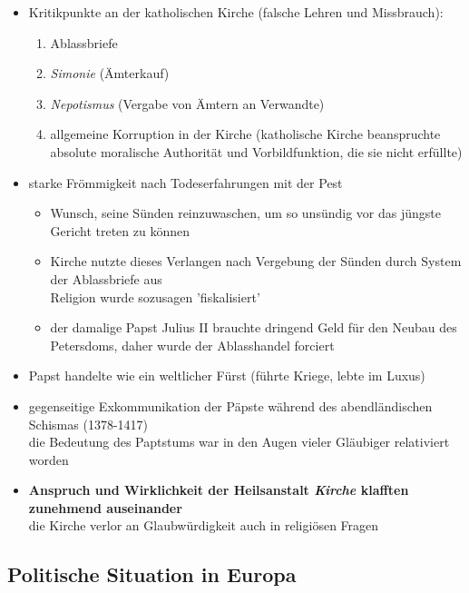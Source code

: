 \documentclass[11pt,a4paper]{article}
\begin{document}
\begin{itemize}
\item Kritikpunkte an der katholischen Kirche (falsche Lehren und Missbrauch):

	\begin{enumerate}
	\item Ablassbriefe
	\item \textsl{Simonie} (Ämterkauf)
	\item \textsl{Nepotismus} (Vergabe von Ämtern an Verwandte)
	\item allgemeine Korruption in der Kirche (katholische Kirche beanspruchte absolute moralische Authorität und Vorbildfunktion, die sie nicht erfüllte)
	\end{enumerate}

\item starke Frömmigkeit nach Todeserfahrungen mit der Pest

	\begin{itemize}
	\item Wunsch, seine Sünden reinzuwaschen, um so unsündig vor das jüngste Gericht treten zu können
	\item Kirche nutzte dieses Verlangen nach Vergebung der Sünden durch System der Ablassbriefe aus\\
	 Religion wurde sozusagen 'fiskalisiert'
	\item der damalige Papst Julius II brauchte dringend Geld für den Neubau des Petersdoms, daher wurde der Ablasshandel forciert
	\end{itemize}


\item Papst handelte wie ein weltlicher Fürst (führte Kriege, lebte im Luxus)

\item gegenseitige Exkommunikation der Päpste während des abendländischen Schismas (1378-1417)\\
 die Bedeutung des Paptstums war in den Augen vieler Gläubiger relativiert worden

\item \textbf{Anspruch und Wirklichkeit der Heilsanstalt \textsl{Kirche} klafften zunehmend auseinander}\\
 die Kirche verlor an Glaubwürdigkeit auch in religiösen Fragen



\end{itemize}


\subsection*{\textsf{Politische Situation in Europa}}
\end{document}
